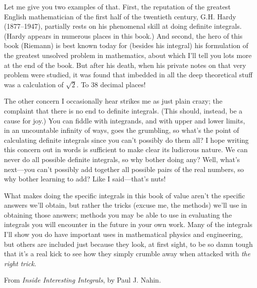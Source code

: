 Let me give you two examples of that. First, the reputation of the greatest
English mathematician of the first half of the twentieth century, G.H. Hardy
(1877–1947), partially rests on his phenomenal skill at doing definite integrals.
(Hardy appears in numerous places in this book.) And second, the hero of this book
(Riemann) is best known today for (besides his integral) his formulation of the
greatest unsolved problem in mathematics, about which I’ll tell you lots more at the
end of the book. But after his death, when his private notes on that very problem
were studied, it was found that imbedded in all the deep theoretical stuff was a
calculation of $ \sqrt{2} $. To 38 decimal places!

The other concern I occasionally hear strikes me as just plain crazy; the
complaint that there is no end to definite integrals. (This should, instead, be a
cause for joy.) You can fiddle with integrands, and with upper and lower limits, in
an uncountable infinity of ways, goes the grumbling, so what’s the point of
calculating definite integrals since you can’t possibly do them all? I hope writing
this concern out in words is sufficient to make clear its ludicrous nature. We can
never do all possible definite integrals, so why bother doing any? Well, what’s
next—you can’t possibly add together all possible pairs of the real numbers, so why
bother learning to add? Like I said—that’s nuts!

What makes doing the specific integrals in this book of value aren’t the specific
answers we’ll obtain, but rather the tricks (excuse me, the methods) we’ll use in
obtaining those answers; methods you may be able to use in evaluating the integrals
you will encounter in the future in your own work. Many of the integrals I’ll show
you do have important uses in mathematical physics and engineering, but others are
included just because they look, at first sight, to be so damn tough that it’s a real
kick to see how they simply crumble away when attacked with \textit{the right trick}.

\begin{flushright}
  From \textit{Inside Interesting Integrals}, by Paul J. Nahin.
\end{flushright}

\clearpage
